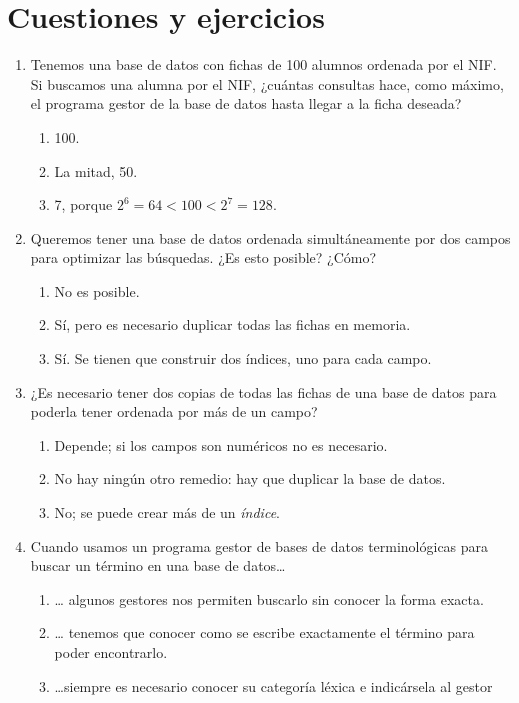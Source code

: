 \section{Cuestiones y ejercicios} \begin{enumerate} 

\item Tenemos una base de datos con fichas de 100 alumnos ordenada por el NIF. Si buscamos una alumna por el NIF, ¿cuántas consultas hace, como máximo, el programa gestor de la base de datos hasta llegar a la ficha deseada? \begin{enumerate} \item 100. \item La mitad, 50. \item 7, porque \(2^6=64 < 100 < 2^7=128\). \end{enumerate} 

\item Queremos tener una base de datos ordenada simultáneamente por dos campos para optimizar las búsquedas. ¿Es esto posible? ¿Cómo? \begin{enumerate} \item No es posible. \item Sí, pero es necesario duplicar todas las fichas en memoria. \item Sí. Se tienen que construir dos índices, uno para cada campo. \end{enumerate} 

\item ¿Es necesario tener dos copias de todas las fichas de una base de datos para poderla tener ordenada por más de un campo? \begin{enumerate} \item Depende; si los campos son numéricos no es necesario. \item No hay ningún otro remedio: hay que duplicar la base de datos. \item No; se puede crear más de un \emph{índice}. \end{enumerate} 

\item Cuando usamos un programa gestor de bases de datos terminológicas para buscar un término en una base de datos{\ldots} \begin{enumerate} \item {\ldots} algunos gestores nos permiten buscarlo sin conocer la forma exacta. \item {\ldots} tenemos que conocer como se escribe exactamente el término para poder encontrarlo. \item {\ldots}siempre es necesario conocer su categoría léxica e indicársela al gestor \end{enumerate} 


\end{enumerate}

